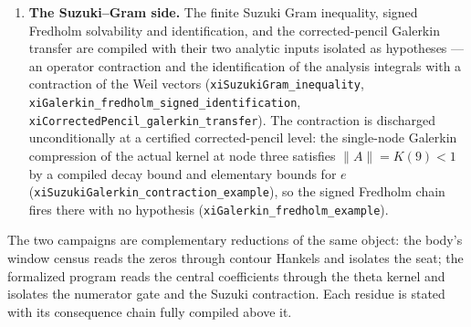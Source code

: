 \documentclass[11pt]{article}
\theoremstyle{plain}
\theoremstyle{definition}
\theoremstyle{remark}
\begin{document}
\begin{enumerate}
Two further compiled ingredients on this route. The cumulant identity
\[
  (\log K)''' \;=\; \langle c'\rangle + 3\,\mathrm{Cov}(s,c) + \mu_3(s),
  \qquad p_n=T_n/K,
\]
verified symbolically, exhibits the mechanism: near the origin the sign is
carried by $\mu_3(s)<0$, the log-slopes being violently left-skewed
($s_0=0.044$ against $s_1=-20.36$), while past $u\approx0.048$ the first
summand turns negative and dominates as $p_0\to1$. Its termwise input is
proved: \texttt{xiKernelTermLogCurvatureDeriv\_neg} gives $c_n'<0$ at every
index for $u\ge1/10$, since $c_n'=8q\bigl(6(2q+3)/I^3-1\bigr)$ is negative
exactly when $8q^3-36q^2+42q-45>0$, which holds on $[19/5,\infty)$ and hence
at every index because $q_n\ge q_0\ge19/5$.
\item \textbf{The Suzuki--Gram side.}  The finite Suzuki Gram inequality,
signed Fredholm solvability and identification, and the corrected-pencil
Galerkin transfer are compiled with their two analytic inputs isolated as
hypotheses --- an operator contraction and the identification of the analysis
integrals with a contraction of the Weil vectors
(\texttt{xiSuzukiGram\_inequality},
\texttt{xiGalerkin\_fredholm\_signed\_identification},
\texttt{xiCorrectedPencil\_galerkin\_transfer}).  The contraction is
discharged unconditionally at a certified corrected-pencil level: the
single-node Galerkin compression of the actual kernel at node three satisfies
$\|A\|=K(9)<1$ by a compiled decay bound and elementary bounds for $e$
(\texttt{xiSuzukiGalerkin\_contraction\_example}), so the signed Fredholm
chain fires there with no hypothesis
(\texttt{xiGalerkin\_fredholm\_example}).
\end{enumerate}

The two campaigns are complementary reductions of the same object: the body's
window census reads the zeros through contour Hankels and isolates the seat;
the formalized program reads the central coefficients through the theta
kernel and isolates the numerator gate and the Suzuki contraction.  Each
residue is stated with its consequence chain fully compiled above it.
\end{document}
